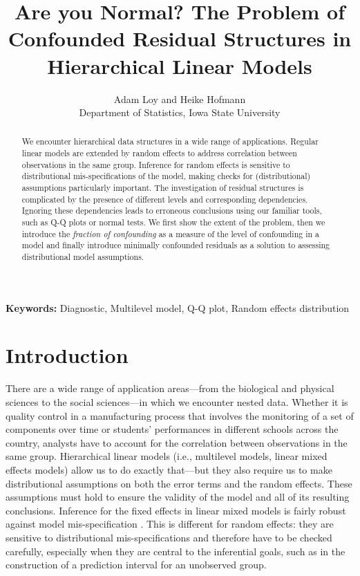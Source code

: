\documentclass[12pt]{article} %
\title{Are you Normal? The Problem of Confounded Residual Structures in Hierarchical Linear Models}
\author{
	Adam Loy and Heike Hofmann\\
	Department of Statistics,
	Iowa State University
}
\newcommand{\hh}[1]{{\color{orange} #1}}
\newcommand{\al}[1]{{\color{red} #1}}
\begin{document}
\maketitle


\begin{abstract}
We encounter hierarchical data structures in a wide range of applications. Regular linear models are extended by random effects to address correlation between observations in the same group. Inference for random effects is sensitive to  distributional mis-specifications of the model, making checks for (distributional) assumptions particularly important.  The investigation of residual structures is complicated by the presence of  different levels and corresponding  dependencies. Ignoring these dependencies leads to  erroneous conclusions using our familiar tools, such as Q-Q plots or normal tests. We first show the extent of the problem, then we introduce the {\it fraction of confounding} as a measure of the level of confounding in a model and finally introduce minimally confounded residuals as a solution to assessing distributional model assumptions.
\end{abstract}
{\bf Keywords:} Diagnostic, Multilevel model, Q-Q plot, Random effects distribution


\section{Introduction}\label{sec:intro}
There are a wide range of application areas---from the biological and physical sciences to the social sciences---in which we encounter nested  data.
Whether it is quality control in a manufacturing process that involves the monitoring of a set of components over  time  or students' performances in different schools across the country, analysts have to account for  the correlation between observations in the same group.  Hierarchical linear models \al{(i.e., multilevel models, linear mixed effects models)} allow us to do exactly that---but they also require us to make distributional assumptions on both the error terms and the random effects. These assumptions must hold to ensure the validity of the model \hh{and all of its resulting conclusions.} 
Inference for the fixed effects in linear mixed models is fairly robust against model mis-specification \citep{Butler:1992tx, Verbeke:1997tf}. This is different for random effects: they are sensitive to  distributional mis-specifications and  therefore have to be checked carefully, especially when they are central to the inferential goals, such as in the construction of a prediction interval for an unobserved group.
\end{document}
